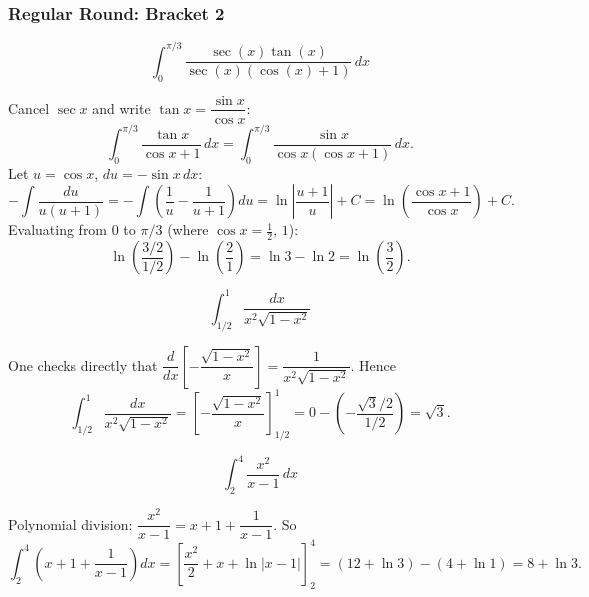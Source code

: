 \subsubsection*{Regular Round: Bracket 2}
\begin{questions}

\question \[\int_0^{\pi/3}\frac{\sec(x)\tan(x)}{\sec(x)(\cos(x)+1)}\,dx\]
\begin{solution}
Cancel $\sec x$ and write $\tan x=\dfrac{\sin x}{\cos x}$:
\[
\int_0^{\pi/3}\frac{\tan x}{\cos x+1}\,dx=\int_0^{\pi/3}\frac{\sin x}{\cos x(\cos x+1)}\,dx.
\]
Let $u=\cos x$, $du=-\sin x\,dx$:
\[
-\int \frac{du}{u(u+1)}=-\int\left(\frac1u-\frac1{u+1}\right)du=\ln\left|\frac{u+1}{u}\right|+C=\ln\left(\frac{\cos x+1}{\cos x}\right)+C.
\]
Evaluating from $0$ to $\pi/3$ (where $\cos x=\tfrac12,\,1$):
\[
\ln\!\left(\frac{3/2}{1/2}\right)-\ln\!\left(\frac{2}{1}\right)=\ln 3-\ln2=\ln\!\left(\frac32\right).
\]
\end{solution}

\question \[\int_{1/2}^1 \frac{dx}{x^2\sqrt{1-x^2}}\]
\begin{solution}
One checks directly that $\dfrac{d}{dx}\left[-\dfrac{\sqrt{1-x^2}}{x}\right]=\dfrac{1}{x^2\sqrt{1-x^2}}$. Hence
\[
\int_{1/2}^1\frac{dx}{x^2\sqrt{1-x^2}}=\left[-\frac{\sqrt{1-x^2}}{x}\right]_{1/2}^1=0-\left(-\frac{\sqrt{3}/2}{1/2}\right)=\sqrt3.
\]
\end{solution}

\question \[\int_2^4 \frac{x^2}{x-1}\,dx\]
\begin{solution}
Polynomial division: $\dfrac{x^2}{x-1}=x+1+\dfrac{1}{x-1}$. So
\[
\int_2^4\left(x+1+\frac{1}{x-1}\right)dx=\left[\frac{x^2}{2}+x+\ln|x-1|\right]_2^4=(12+\ln3)-(4+\ln1)=8+\ln3.
\]
\end{solution}

\end{questions}

